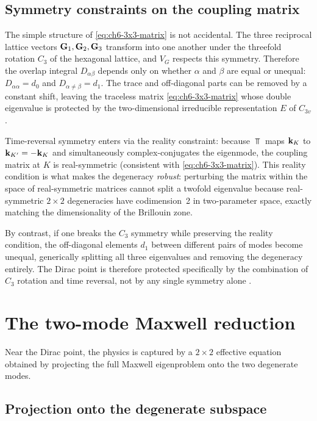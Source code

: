 \subsection{Symmetry constraints on the coupling matrix}
\label{sec:ch6-symmetry-coupling}

The simple structure of \eqref{eq:ch6-3x3-matrix} is not accidental.
The three reciprocal lattice vectors $\mathbf{G}_1,\mathbf{G}_2,\mathbf{G}_3$
transform into one another under the threefold rotation $C_3$ of the
hexagonal lattice, and $V_G$ respects this symmetry.  Therefore the
overlap integral $D_{\alpha\beta}$ depends only on whether $\alpha$
and $\beta$ are equal or unequal: $D_{\alpha\alpha}=d_0$ and
$D_{\alpha\neq\beta}=d_1$.  The trace and off-diagonal parts can be
removed by a constant shift, leaving the traceless matrix
\eqref{eq:ch6-3x3-matrix} whose double eigenvalue is protected by the
two-dimensional irreducible representation $E$ of $C_{3v}$.

Time-reversal symmetry enters via the reality constraint:
because $\Top$ maps $\mathbf{k}_K$ to $\mathbf{k}_{K'}=-\mathbf{k}_K$ and simultaneously
complex-conjugates the eigenmode, the coupling matrix at $K$ is
real-symmetric (consistent with \eqref{eq:ch6-3x3-matrix}).  This
reality condition is what makes the degeneracy \emph{robust}: perturbing
the matrix within the space of real-symmetric matrices cannot split a
twofold eigenvalue because real-symmetric $2\times 2$ degeneracies have
codimension~2 in two-parameter space, exactly matching the
dimensionality of the Brillouin zone.

By contrast, if one breaks the $C_3$ symmetry while preserving the
reality condition, the off-diagonal elements $d_1$ between different
pairs of modes become unequal, generically splitting all three
eigenvalues and removing the degeneracy entirely.  The Dirac point is
therefore protected specifically by the combination of $C_3$ rotation
and time reversal, not by any single symmetry alone
\cite{ozawa2018topological}.

\section{The two-mode Maxwell reduction}
\label{sec:ch6-two-mode}

Near the Dirac point, the physics is captured by a $2\times 2$
effective equation obtained by projecting the full Maxwell eigenproblem
onto the two degenerate modes.

\subsection{Projection onto the degenerate subspace}
\label{sec:ch6-projection}

